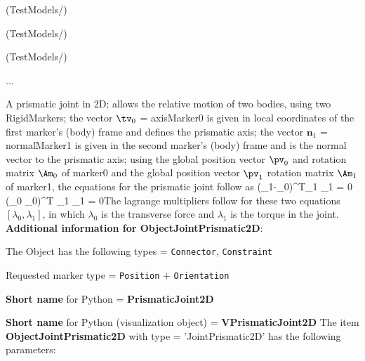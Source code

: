 \item {} (TestModels/)
\item {} (TestModels/)
\item {} (TestModels/)
\item  ...

\ei

%
\newpage

\label{sec:item:ObjectJointPrismatic2D}
A prismatic joint in 2D; allows the relative motion of two bodies, using two RigidMarkers; the vector $\tv_0$ = axisMarker0 is given in local coordinates of the first marker's (body) frame and defines the prismatic axis; the vector $\mathbf{n}_1$ = normalMarker1 is given in the second marker's (body) frame and is the normal vector to the prismatic axis; using the global position vector $\pv_0$ and rotation matrix $\Am_0$ of marker0 and the global position vector $\pv_1$ rotation matrix $\Am_1$ of marker1, the equations for the prismatic joint follow as \be (\pv_1-\pv_0)^T\cdot \Am_1 \cdot {}_1 = 0 \ee  \be (\Am_0 \cdot \tv_0)^T \cdot \Am_1 \cdot {}_1 = 0\ee The lagrange multipliers follow for these two equations $[\lambda_0,\lambda_1]$, in which $\lambda_0$ is the transverse force and $\lambda_1$ is the torque in the joint.\vspace{12pt}
 \\{\bf Additional information for ObjectJointPrismatic2D}:
\bi
  \item The Object has the following types = \texttt{Connector}, \texttt{Constraint}
  \item Requested marker type = \texttt{Position} + \texttt{Orientation}
  \item {\bf Short name} for Python = {\bf PrismaticJoint2D}  \item {\bf Short name} for Python (visualization object) = {\bf VPrismaticJoint2D}\ei
\vspace{12pt} \noindent The item {\bf ObjectJointPrismatic2D} with type = 'JointPrismatic2D' has the following parameters:\vspace{-1cm}\\ 
